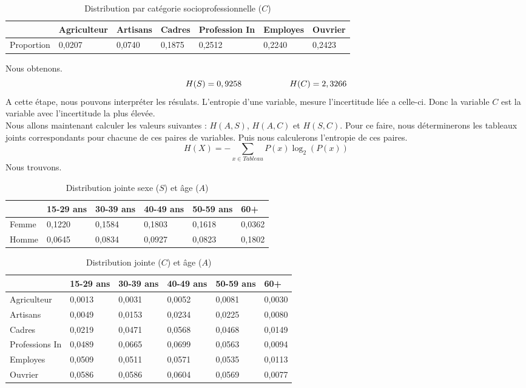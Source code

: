 \documentclass{article}
\begin{document}
\begin{table}[H]
  \centering
  \caption{Distribution par catégorie socioprofessionnelle ($C$)}
  \begin{tabular}{|l|l|l|l|l|l|l|}
  \hline
             & Agriculteur & Artisans & Cadres & Profession In & Employes & Ouvrier \\ \hline
  Proportion & 0,0207      & 0,0740   & 0,1875 & 0,2512        & 0,2240   & 0,2423  \\ \hline
  \end{tabular}
  \end{table}


Nous obtenons.
\[
H(S) = 0,9258  \hspace{2 cm} H(C)= 2,3266
\]
A cette étape, nous pouvons interpréter les résulats. L'entropie d'une variable, mesure l'incertitude liée a celle-ci. Donc la variable $C$ est la variable avec l'incertitude la plus élevée.\\
Nous allons maintenant calculer les valeurs suivantes : $H(A,S)$, $H(A,C)$ et $H(S,C)$. Pour ce faire, nous déterminerons les tableaux joints correspondants pour chacune de ces paires de variables. Puis nous calculerons l'entropie de ces paires.
\[
  H(X) = - \sum_{x \in Tableau} P(x) \log_2(P(x))
\]
Nous trouvons.
\begin{table}[H]
  \centering
  \caption{Distribution jointe sexe ($S$) et âge ($A$)}
  \begin{tabular}{|l|l|l|l|l|l|}
  \hline
        & 15-29 ans & 30-39 ans & 40-49 ans & 50-59 ans & 60+    \\ \hline
  Femme & 0,1220    & 0,1584    & 0,1803    & 0,1618    & 0,0362 \\ \hline
  Homme & 0,0645    & 0,0834    & 0,0927    & 0,0823    & 0,1802 \\ \hline
  \end{tabular}
\end{table}

  \begin{table}[H]
    \centering
    \caption{Distribution jointe ($C$) et âge ($A$)}
    \begin{tabular}{|l|l|l|l|l|l|}
    \hline
                   & 15-29 ans & 30-39 ans & 40-49 ans & 50-59 ans & 60+    \\ \hline
    Agriculteur    & 0,0013    & 0,0031    & 0,0052    & 0,0081    & 0,0030 \\ \hline
    Artisans       & 0,0049    & 0,0153    & 0,0234    & 0,0225    & 0,0080 \\ \hline
    Cadres         & 0,0219    & 0,0471    & 0,0568    & 0,0468    & 0,0149 \\ \hline
    Professions In & 0,0489    & 0,0665    & 0,0699    & 0,0563    & 0,0094 \\ \hline
    Employes       & 0,0509    & 0,0511    & 0,0571    & 0,0535    & 0,0113 \\ \hline
    Ouvrier        & 0,0586    & 0,0586    & 0,0604    & 0,0569    & 0,0077 \\ \hline
    \end{tabular}
  \end{table}
\end{document}
